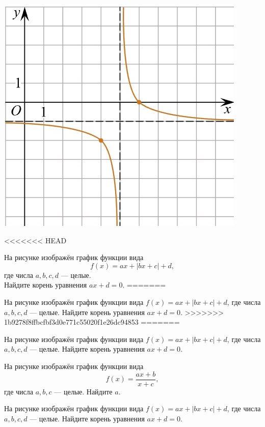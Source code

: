 \begin{class}[number=5]
\begin{listofex}
\begin{minipage}[t]{\bodywidth}
\begin{minipage}[t]{\bodywidth}
\begin{minipage}[t]{\bodywidth}
\begin{minipage}[t]{\bodywidth}
\begin{minipage}[t]{0.43\textwidth}
\begin{minipage}[t]{\bodywidth}
\begin{minipage}[t]{0.43\textwidth}
\begin{minipage}[t]{\bodywidth}
\begin{minipage}[t]{0.43\textwidth}
\begin{minipage}[t]{\bodywidth}
\begin{minipage}[t]{0.43\textwidth}
\begin{minipage}[t]{\bodywidth}
\begin{minipage}[t]{\bodywidth}
\begin{minipage}[t]{\picwidth}
			\includegraphics[align=t, width=\linewidth]{../pics/G101M4C5-5.jpg}
		\end{minipage}
		\item
<<<<<<< HEAD
		\begin{minipage}[t]{\bodywidth}
			На рисунке изображён график функции вида \[ f(x)=ax+|bx+c|+d, \] где числа \(a, b, c, d\) --- целые.\\ Найдите корень уравнения \(ax+d=0\).
=======
		\begin{minipage}[t]{0.43\textwidth}
			На рисунке изображён график функции вида \(f(x)=ax+|bx+c|+d\), где числа \(a, b, c, d\) --- целые. Найдите корень уравнения \(ax+d=0\).
>>>>>>> 1b9278f8ffbcfbf3d0e771c55020f1e26dc94853
=======
		\begin{minipage}[t]{0.43\textwidth}
			На рисунке изображён график функции вида \(f(x)=ax+|bx+c|+d\), где числа \(a, b, c, d\) --- целые. Найдите корень уравнения \(ax+d=0\).
		\begin{minipage}[t]{\bodywidth}
			На рисунке изображён график функции вида \[ f(x)=\dfrac{ax+b}{x+c}, \] где числа \(a, b, c\) --- целые. Найдите \(a\).
		\begin{minipage}[t]{0.43\textwidth}
			На рисунке изображён график функции вида \(f(x)=ax+|bx+c|+d\), где числа \(a, b, c, d\) --- целые. Найдите корень уравнения \(ax+d=0\).

\end{minipage}
\end{minipage}
\end{minipage}
\end{minipage}
\end{minipage}
\end{minipage}
\end{minipage}
\end{minipage}
\end{minipage}
\end{minipage}
\end{minipage}
\end{minipage}
\end{minipage}
\end{minipage}
\end{minipage}
\end{minipage}
\end{minipage}
\end{minipage}
\end{listofex}
\end{class}
